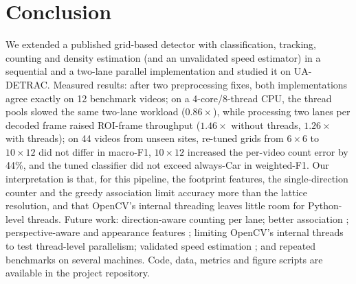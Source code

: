 \documentclass[conference]{IEEEtran}
\begin{document}
\section{Conclusion}
\label{sec:conclusion}
We extended a published grid-based detector with classification,
tracking, counting and density estimation (and an unvalidated speed
estimator) in a sequential and a two-lane parallel implementation and
studied it on UA-DETRAC. Measured results: after two preprocessing fixes,
both implementations agree exactly on 12 benchmark videos; on a
4-core/8-thread CPU, the thread pools slowed the same two-lane workload
($0.86\times$), while processing two lanes per decoded frame raised
ROI-frame throughput ($1.46\times$ without threads, $1.26\times$ with
threads); on 44 videos from unseen sites, re-tuned grids from $6{\times}6$
to $10{\times}12$ did not differ in macro-F1, $10{\times}12$ increased the
per-video count error by 44\%, and the tuned classifier did not exceed
always-Car in weighted-F1. Our interpretation is that, for this pipeline,
the footprint features, the single-direction counter and the greedy
association limit accuracy more than the lattice resolution, and that
OpenCV's internal threading leaves little room for Python-level threads.
Future work: direction-aware counting per lane; better association
\cite{bewley2016,wojke2017}; perspective-aware and appearance features
\cite{chang2025,macko2025}; limiting OpenCV's internal threads to test
thread-level parallelism; validated speed estimation \cite{kamil2024};
and repeated benchmarks on several machines. Code, data, metrics and
figure scripts are available in the project repository.
\end{document}
